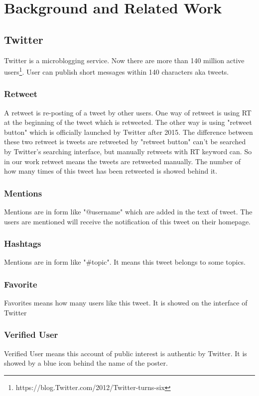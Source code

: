 \chapter{Background and Related Work} %
\label{cha:Related_Work}
\section{Twitter}
Twitter is a microblogging service. Now there are more than 140 million active users\footnote{https://blog.Twitter.com/2012/Twitter-turns-six}. User can publish short messages within 140 characters aka tweets.
\subsection{Retweet}
A retweet is re-posting of a tweet by other users. One way of retweet is using RT at the beginning of the tweet which is retweeted. The other way is using "retweet button" which is officially launched by Twitter after 2015. The difference between these two retweet is tweets are retweeted by "retweet button" can't be searched by Twitter's searching interface, but manually retweets with RT keyword can. So in our work retweet means the tweets are retweeted manually. The number of how many times of this tweet has been retweeted is showed behind it.

\subsection{Mentions}
Mentions are in form like "@username" which are added in the text of tweet. The users are mentioned will receive the notification of this tweet on their homepage.
\subsection{Hashtags}
Mentions are in form like "\#topic". It means this tweet belongs to some topics.

\subsection{Favorite}
Favorites means how many users like this tweet. It is showed on the interface of Twitter
\subsection{Verified User}
Verified User means this account of public interest is authentic by Twitter. It is showed by a blue icon behind the name of the poster.
